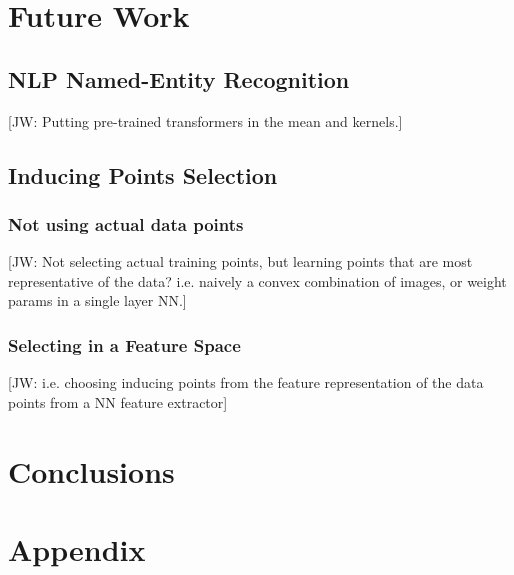 \documentclass{article}
\newcommand{\jw}[1]{{\color{gray} [JW: #1]}}
\numberwithin{equation}{section}
\begin{document}
\newpage
\section{Future Work}
\subsection{NLP Named-Entity Recognition}
\jw{Putting pre-trained transformers in the mean and kernels.}


\subsection{Inducing Points Selection}
\subsubsection{Not using actual data points}
\jw{Not selecting actual training points, but learning points that are most representative of the data? i.e. naively a convex combination of images, or weight params in a single layer NN.}
\subsubsection{Selecting in a Feature Space}
\jw{i.e. choosing inducing points from the feature representation of the data points from a NN feature extractor}


\newpage
\section{Conclusions}

\newpage



\newpage
\appendix
\section{Appendix}
\end{document}
